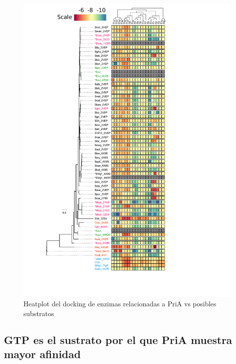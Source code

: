 \documentclass[12pt,twoside]{reedthesis}
\begin{document}
  \begin{figure}[h!tbp]
  \centering
  \includegraphics[angle = 0,scale = .7]{chapter4/Figura1_4.pdf}
  \caption[Heatplot del docking de enzimas relacionadas a PriA vs posibles substratos]{\footnotesize{Heatplot del docking de enzimas relacionadas a PriA vs posibles substratos}}
  \label{fig:HeatplodPriAdocking}
  \end{figure}
  
  \subsection{GTP es el sustrato por el que PriA muestra mayor
  afinidad}\label{gtp-es-el-sustrato-por-el-que-pria-muestra-mayor-afinidad}
  
\end{document}
